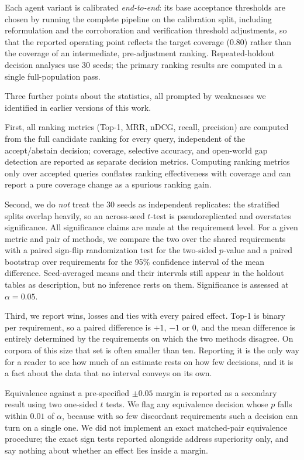 \documentclass[smallextended,natbib]{svjour3}
\begin{document}
Each agent variant is calibrated \emph{end-to-end}: its base acceptance thresholds are chosen by running the complete pipeline on the calibration split, including reformulation and the corroboration and verification threshold adjustments, so that the reported operating point reflects the target coverage (0.80) rather than the coverage of an intermediate, pre-adjustment ranking. Repeated-holdout decision analyses use 30 seeds; the primary ranking results are computed in a single full-population pass.

\label{sec:protocol-stats}
Three further points about the statistics, all prompted by weaknesses we identified in earlier versions of this work.

First, all ranking metrics (Top-1, MRR, nDCG, recall, precision) are computed from the full candidate ranking for every query, independent of the accept/abstain decision; coverage, selective accuracy, and open-world gap detection are reported as separate decision metrics. Computing ranking metrics only over accepted queries conflates ranking effectiveness with coverage and can report a pure coverage change as a spurious ranking gain.

Second, we do \emph{not} treat the 30 seeds as independent replicates: the stratified splits overlap heavily, so an across-seed $t$-test is pseudoreplicated and overstates significance. All significance claims are made at the requirement level. For a given metric and pair of methods, we compare the two over the shared requirements with a paired sign-flip randomization test for the two-sided $p$-value and a paired bootstrap over requirements for the 95\% confidence interval of the mean difference. Seed-averaged means and their intervals still appear in the holdout tables as description, but no inference rests on them. Significance is assessed at $\alpha = 0.05$.

Third, we report wins, losses and ties with every paired effect. Top-1 is binary per requirement, so a paired difference is $+1$, $-1$ or $0$, and the mean difference is entirely determined by the requirements on which the two methods disagree. On corpora of this size that set is often smaller than ten. Reporting it is the only way for a reader to see how much of an estimate rests on how few decisions, and it is a fact about the data that no interval conveys on its own.

Equivalence against a pre-specified $\pm 0.05$ margin is reported as a secondary result using two one-sided $t$ tests. We flag any equivalence decision whose $p$ falls within $0.01$ of $\alpha$, because with so few discordant requirements such a decision can turn on a single one. We did not implement an exact matched-pair equivalence procedure; the exact sign tests reported alongside address superiority only, and say nothing about whether an effect lies inside a margin.
\end{document}
